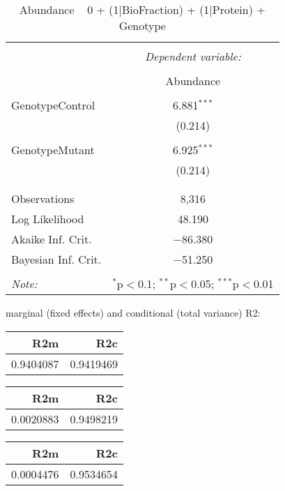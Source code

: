 \documentclass[11pt]{report}
\begin{document}
\begin{table}[!htbp] \centering 
  \caption{Abundance ~ 0 + (1|BioFraction) + (1|Protein) + Genotype} 
  \label{} 
\begin{tabular}{@{\extracolsep{5pt}}lc} 
\\[-1.8ex]\hline 
\hline \\[-1.8ex] 
 & \multicolumn{1}{c}{\textit{Dependent variable:}} \\ 
\cline{2-2} 
\\[-1.8ex] & Abundance \\ 
\hline \\[-1.8ex] 
 GenotypeControl & 6.881$^{***}$ \\ 
  & (0.214) \\ 
  & \\ 
 GenotypeMutant & 6.925$^{***}$ \\ 
  & (0.214) \\ 
  & \\ 
\hline \\[-1.8ex] 
Observations & 8,316 \\ 
Log Likelihood & 48.190 \\ 
Akaike Inf. Crit. & $-$86.380 \\ 
Bayesian Inf. Crit. & $-$51.250 \\ 
\hline 
\hline \\[-1.8ex] 
\textit{Note:}  & \multicolumn{1}{r}{$^{*}$p$<$0.1; $^{**}$p$<$0.05; $^{***}$p$<$0.01} \\ 
\end{tabular} 
\end{table} 
marginal (fixed effects) and conditional (total variance) R2:

\begin{tabular}{r|r}
\hline
R2m & R2c\\
\hline
0.9404087 & 0.9419469\\
\hline
\end{tabular}

\begin{tabular}{r|r}
\hline
R2m & R2c\\
\hline
0.0020883 & 0.9498219\\
\hline
\end{tabular}

\begin{tabular}{r|r}
\hline
R2m & R2c\\
\hline
0.0004476 & 0.9534654\\
\hline
\end{tabular}
\end{document}
